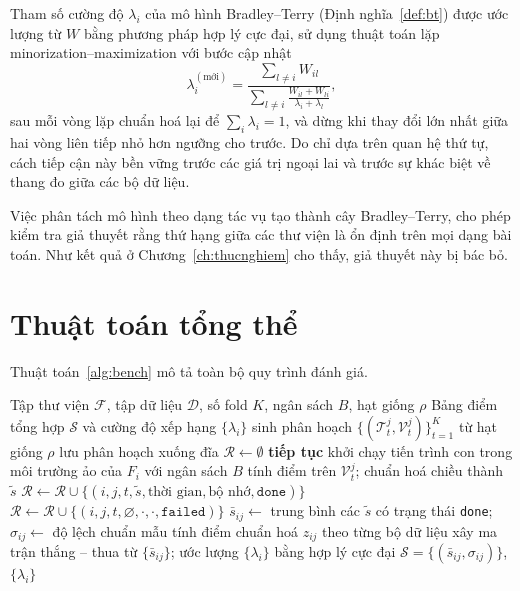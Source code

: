 Tham số cường độ $\lambda_i$ của mô hình Bradley--Terry (Định nghĩa~\ref{def:bt})
được ước lượng từ $W$ bằng phương pháp hợp lý cực đại, sử dụng thuật toán lặp
minorization--maximization với bước cập nhật
\[
    \lambda_i^{(\text{mới})} = \frac{\sum_{l \neq i} W_{il}}
    {\displaystyle\sum_{l \neq i} \frac{W_{il} + W_{li}}{\lambda_i + \lambda_l}},
\]
sau mỗi vòng lặp chuẩn hoá lại để $\sum_i \lambda_i = 1$, và dừng khi thay đổi lớn
nhất giữa hai vòng liên tiếp nhỏ hơn ngưỡng cho trước. Do chỉ dựa trên quan hệ thứ
tự, cách tiếp cận này bền vững trước các giá trị ngoại lai và trước sự khác biệt về
thang đo giữa các bộ dữ liệu.

Việc phân tách mô hình theo dạng tác vụ tạo thành cây Bradley--Terry, cho phép
kiểm tra giả thuyết rằng thứ hạng giữa các thư viện là ổn định trên mọi dạng bài
toán. Như kết quả ở Chương~\ref{ch:thucnghiem} cho thấy, giả thuyết này bị bác bỏ.

\section{Thuật toán tổng thể}
\label{sec:thuattoan}
Thuật toán~\ref{alg:bench} mô tả toàn bộ quy trình đánh giá.

\begin{algorithm}[H]
\caption{Quy trình đánh giá AutoML công bằng}
\label{alg:bench}
\begin{algorithmic}[1]
\Require Tập thư viện $\mathcal{F}$, tập dữ liệu $\mathcal{D}$, số fold $K$, ngân sách $B$, hạt giống $\rho$
\Ensure Bảng điểm tổng hợp $\mathcal{S}$ và cường độ xếp hạng $\{\lambda_i\}$
 
    \State sinh phân hoạch $\{(\mathcal{T}^j_t, \mathcal{V}^j_t)\}_{t=1}^{K}$ từ hạt giống $\rho$
    \State lưu phân hoạch xuống đĩa
\EndFor
\State $\mathcal{R} \gets \emptyset$ 
        \State \textbf{tiếp tục} 
    \EndIf
    \State khởi chạy tiến trình con trong môi trường ảo của $F_i$ với ngân sách $B$
        \State tính điểm trên $\mathcal{V}^j_t$; chuẩn hoá chiều thành $\tilde{s}$
        \State $\mathcal{R} \gets \mathcal{R} \cup \{(i,j,t,\tilde{s},\text{thời gian},\text{bộ nhớ},\texttt{done})\}$
    \Else
        \State $\mathcal{R} \gets \mathcal{R} \cup \{(i,j,t,\varnothing,\cdot,\cdot,\texttt{failed})\}$
    \EndIf
\EndFor
{}
    \State $\bar{s}_{ij} \gets$ trung bình các $\tilde{s}$ có trạng thái \texttt{done}; $\sigma_{ij} \gets$ độ lệch chuẩn mẫu
\EndFor
\State tính điểm chuẩn hoá $z_{ij}$ theo từng bộ dữ liệu
\State xây ma trận thắng -- thua từ $\{\bar{s}_{ij}\}$; ước lượng $\{\lambda_i\}$ bằng hợp lý cực đại
\State \Return $\mathcal{S} = \{(\bar{s}_{ij}, \sigma_{ij})\}$, $\{\lambda_i\}$
\end{algorithmic}
\end{algorithm}

